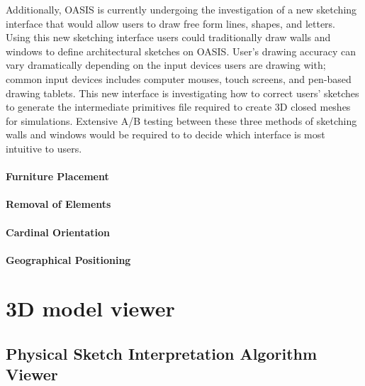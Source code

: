 Additionally, OASIS is currently undergoing the investigation of a new sketching interface that would allow users to draw free form lines, shapes, and letters.
Using this new sketching interface users could traditionally draw walls and windows to define architectural sketches on OASIS.
User's drawing accuracy can vary dramatically depending on the input devices users are drawing with; common input devices includes computer mouses, touch screens, and pen-based drawing tablets.
This new interface is investigating how to correct users' sketches to  generate the intermediate primitives file required to create  3D closed meshes for simulations.
Extensive A/B testing between these three methods of sketching walls and windows  would be required to to decide which interface is most intuitive to users.



\paragraph{Furniture Placement}
\paragraph{Removal of Elements}
\paragraph{Cardinal Orientation}
\paragraph{Geographical Positioning}

\section{3D model viewer}

\subsection{Physical Sketch Interpretation Algorithm Viewer}
